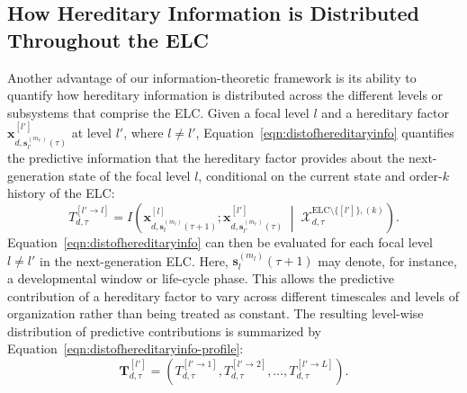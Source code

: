 \documentclass[pdflatex,sn-mathphys-num]{sn-jnl}
\theoremstyle{thmstylethree}
\theoremstyle{thmstyleone}
\begin{document}
\subsection{How Hereditary Information is Distributed Throughout the ELC}
Another advantage of our information-theoretic framework is its ability to quantify how hereditary information is distributed across the different levels or subsystems that comprise the ELC. Given a focal level $l$ and a hereditary factor $\mathbf{x}^{[l']}_{d,\mathbf{s}^{(m_{l'})}_{l'}(\tau)}$ at level $l'$, where $l\neq l'$, Equation~\ref{eqn:distofhereditaryinfo} quantifies the predictive information that the hereditary factor provides about the next-generation state of the focal level $l$, conditional on the current state and order-$k$ history of the ELC:
\begin{equation}
\label{eqn:distofhereditaryinfo}
T^{[l' \to l]}_{d,\tau}
=
I\left(
\mathbf{x}^{[l]}_{d,\mathbf{s}^{(m_l)}_l(\tau+1)};
\mathbf{x}^{[l']}_{d,\mathbf{s}^{(m_{l'})}_{l'}(\tau)}
\;\middle|\;
\mathcal{X}^{\mathrm{ELC}\setminus\{[l']\},(k)}_{d,\tau}
\right).
\end{equation}
Equation~\ref{eqn:distofhereditaryinfo} can then be evaluated for each focal level $l\neq l'$ in the next-generation ELC. Here, $\mathbf{s}^{(m_l)}_l(\tau+1)$ may denote, for instance, a developmental window or life-cycle phase. This allows the predictive contribution of a hereditary factor to vary across different timescales and levels of organization rather than being treated as constant.%
The resulting level-wise distribution of predictive contributions is summarized by Equation~\ref{eqn:distofhereditaryinfo-profile}:
\begin{equation}
\label{eqn:distofhereditaryinfo-profile}
\mathbf{T}^{[l']}_{d,\tau}
=
\left(
T^{[l' \to 1]}_{d,\tau},
T^{[l' \to 2]}_{d,\tau},
\ldots,
T^{[l' \to L]}_{d,\tau}
\right).
\end{equation}
\end{document}
